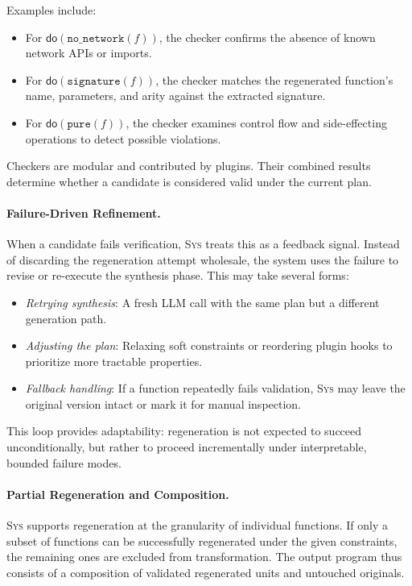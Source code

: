 \documentclass[sigplan]{acmart}
\newcommand{\sys}{{\scshape Sys}\xspace}
\begin{document}
Examples include:
\begin{itemize}
  \item For $\mathsf{do}(\texttt{no\_network}(f))$, the checker confirms the absence of known network APIs or imports.
  \item For $\mathsf{do}(\texttt{signature}(f))$, the checker matches the regenerated function’s name, parameters, and arity against the extracted signature.
  \item For $\mathsf{do}(\texttt{pure}(f))$, the checker examines control flow and side-effecting operations to detect possible violations.
\end{itemize}

Checkers are modular and contributed by plugins. Their combined results determine whether a candidate is considered valid under the current plan.

\paragraph{Failure-Driven Refinement.}
When a candidate fails verification, \sys treats this as a feedback signal. Instead of discarding the regeneration attempt wholesale, the system uses the failure to revise or re-execute the synthesis phase. This may take several forms:
\begin{itemize}
  \item \emph{Retrying synthesis}: A fresh LLM call with the same plan but a different generation path.
  \item \emph{Adjusting the plan}: Relaxing soft constraints or reordering plugin hooks to prioritize more tractable properties.
  \item \emph{Fallback handling}: If a function repeatedly fails validation, \sys may leave the original version intact or mark it for manual inspection.
\end{itemize}

This loop provides adaptability: regeneration is not expected to succeed unconditionally, but rather to proceed incrementally under interpretable, bounded failure modes.

\paragraph{Partial Regeneration and Composition.}
\sys supports regeneration at the granularity of individual functions. If only a subset of functions can be successfully regenerated under the given constraints, the remaining ones are excluded from transformation. The output program thus consists of a composition of validated regenerated units and untouched originals.
\end{document}
